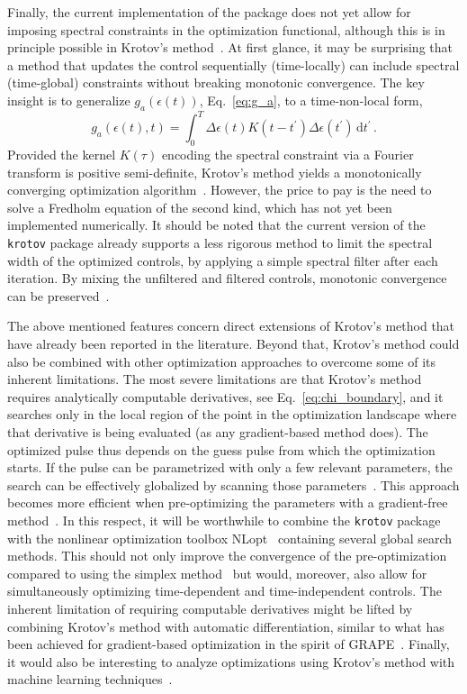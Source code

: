 \documentclass[submission, Phys]{SciPost}
\newcommand{\dd}[0]{\,\text{d}}
\begin{document}
Finally, the current implementation of the package does not yet allow for
imposing spectral constraints in the optimization functional, although this is
in principle possible in Krotov's method~\cite{PalaoPRA13,ReichJMO14}.
At first glance, it may be surprising that a method that updates the control
sequentially (time-locally) can include spectral (time-global) constraints
without breaking monotonic convergence.
The key insight is to generalize $g_a(\epsilon(t))$, Eq.~\eqref{eq:g_a}, to a
time-non-local form,
\begin{equation}
  g_a(\epsilon(t),t) = \int_0^T \Delta\epsilon(t) K(t-t^\prime)
  \Delta\epsilon(t^\prime) \dd t^\prime\,.
\end{equation}
Provided the kernel $K(\tau)$ encoding the spectral constraint via a Fourier
transform is positive semi-definite, Krotov's method yields a monotonically
converging optimization algorithm~\cite{ReichJMO14}.
However, the price to pay is the need to solve a Fredholm equation of the second
kind, which has not yet been implemented numerically.
It should be noted that the current version of the \texttt{krotov} package
already supports a less rigorous method to limit the spectral width of the
optimized controls, by applying a simple spectral filter after each iteration.
By mixing the unfiltered and filtered controls, monotonic convergence can be
preserved~\cite{LapertPRA09}.


The above mentioned features concern direct extensions of Krotov's method that
have already been reported in the literature.
Beyond that, Krotov's method could also be combined with other optimization
approaches to overcome some of its inherent limitations.
The most severe limitations are that Krotov's method requires analytically
computable derivatives, see Eq.~\eqref{eq:chi_boundary}, and it searches only in
the local region of the point in the optimization landscape where that
derivative is being evaluated (as any gradient-based method does). The optimized
pulse thus depends on the guess pulse from which the optimization starts.
If the pulse can be parametrized with only a few relevant parameters, the search
can be effectively globalized by scanning those parameters~\cite{GoerzNPJQI17}.
This approach becomes more efficient when pre-optimizing the parameters with a
gradient-free method~\cite{GoerzEPJQT2015}.
In this respect, it will be worthwhile to combine the \texttt{krotov} package
with the nonlinear optimization toolbox NLopt~\cite{NLOpt} containing several
global search methods.
This should not only improve the convergence of the pre-optimization compared to
using the simplex method~\cite{GoerzEPJQT2015} but would, moreover, also allow
for simultaneously optimizing time-dependent and time-independent controls.
%
The inherent limitation of requiring computable derivatives might be lifted by
combining Krotov's method with automatic differentiation, similar to what has
been achieved for gradient-based optimization in the spirit of
GRAPE~\cite{LeungPRA2017,AbdelhafezPRA2019}.
Finally, it would also be interesting to analyze optimizations using Krotov's
method with machine learning techniques~\cite{BukinPRX2018}.
\end{document}

